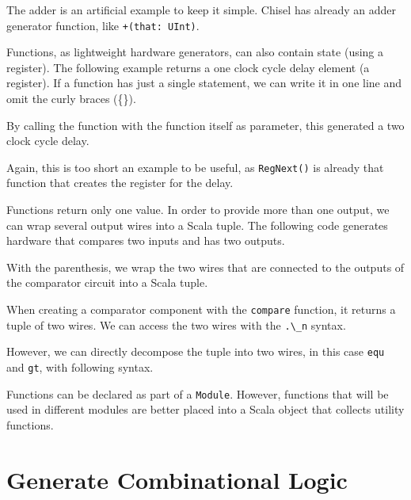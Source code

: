 \documentclass[%
    10pt,
    headinclude, footexclude,
    openright, %
    notitlepage,
    cleardoubleempty,
    headsepline,
    pointlessnumbers,
    bibtotoc, idxtotoc,
    ]{scrbook}
\newcommand{\code}[1]{{\lstinline[basicstyle=\small\ttfamily]{#1}}}
\begin{document}
The adder is an artificial example
to keep it simple. Chisel has already an adder generator function, like \code{+(that: UInt)}.

Functions, as lightweight hardware generators, can also contain state (using a register).
The following example returns a one clock cycle delay element (a register).
If a function has just a single statement, we can write it in one line and omit the curly
braces (\{\}).


\noindent By calling the function with the function itself as parameter, this generated a two
clock cycle delay.


\noindent Again, this is too short an example to be useful, as \code{RegNext()}
is already that function that creates the register for the delay.



Functions return only one value. In order to provide more than one output, we
can wrap several output wires into a Scala tuple. The following code generates hardware that
compares two inputs and has two outputs.


\noindent With the parenthesis, we wrap the two wires that are connected to the outputs of
the comparator circuit into a Scala tuple.

When creating a comparator component
with the \code{compare} function, it returns a tuple of two wires. We can access the two
wires with the \code{.\_n} syntax.


\noindent However, we can directly decompose the tuple into two wires, in this case \code{equ}
and \code{gt}, with following syntax.



Functions can be declared as part of a \code{Module}. However, functions that will be
used in different modules are better placed into a Scala object that collects utility
functions.

\section{Generate Combinational Logic}
\label{sec:gen:comb:logic}
\end{document}
